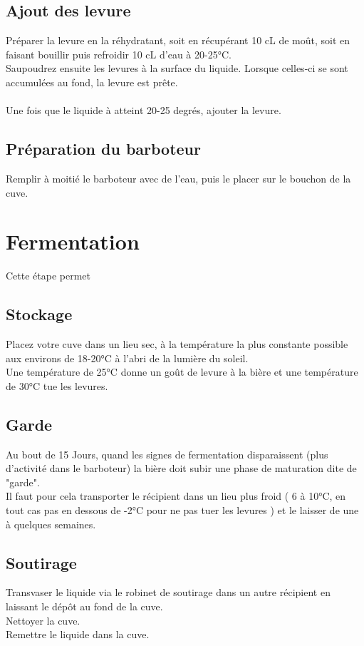 \documentclass[twoside,twocolumn]{report}
\begin{document}
			\subsection{Ajout des levure}
				Préparer la levure en la réhydratant, soit en récupérant 10 cL de moût, soit en faisant bouillir puis refroidir 10 cL d’eau à 20-25°C.\\
				Saupoudrez ensuite les levures à la surface	du liquide. Lorsque celles-ci se sont accumulées au fond, la levure est prête.\\ \\
												
				Une fois que le liquide à atteint 20-25 degrés, ajouter la levure.\\
			
			\subsection{Préparation du barboteur}
				Remplir à moitié le barboteur avec de l’eau, puis le placer sur le bouchon
				de la cuve.
		 
		 \section{Fermentation}
		 Cette étape permet 
			 \subsection{Stockage}
				  Placez votre cuve dans un lieu sec, à la température la
				 plus constante possible aux environs de 18-20°C à l’abri de
				 la lumière  du soleil.\\
				 Une température de 25°C donne un goût de levure à la bière et une température de 30°C tue les levures.\\
			 \subsection{Garde}
				 Au bout de 15 Jours, quand les signes de fermentation disparaissent (plus d’activité dans le barboteur) la bière doit subir une phase de maturation dite de "garde".\\
				 Il faut pour cela transporter le récipient dans un lieu plus froid ( 6 à 10°C, en tout cas pas en dessous de -2°C pour ne pas tuer les levures ) et le laisser de une à quelques semaines.
			 \subsection{Soutirage}
				 Transvaser le liquide via le robinet de soutirage dans un autre récipient en laissant le dépôt au fond de la cuve.\\
				 Nettoyer la cuve.\\
				 Remettre le liquide dans la cuve.\\
				 
\end{document}
